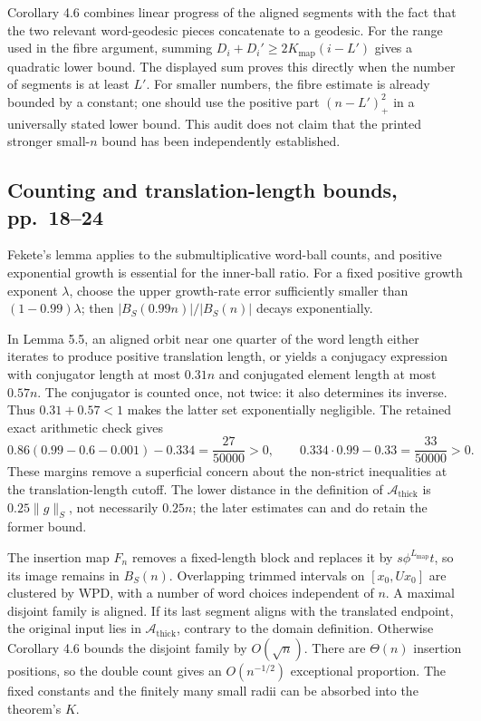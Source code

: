 \documentclass[10pt]{article}
\begin{document}
Corollary 4.6 combines linear progress of the aligned segments with the fact that the two relevant word-geodesic pieces concatenate to a geodesic. For the range used in the fibre argument, summing \(D_i+D_i'\ge 2K_{\mathrm{map}}(i-L')\) gives a quadratic lower bound. The displayed sum proves this directly when the number of segments is at least \(L'\). For smaller numbers, the fibre estimate is already bounded by a constant; one should use the positive part \((n-L')_+^2\) in a universally stated lower bound. This audit does not claim that the printed stronger small-\(n\) bound has been independently established.\par
\subsection*{Counting and translation-length bounds, pp. 18–24}
Fekete’s lemma applies to the submultiplicative word-ball counts, and positive exponential growth is essential for the inner-ball ratio. For a fixed positive growth exponent \(\lambda\), choose the upper growth-rate error sufficiently smaller than \((1-0.99)\lambda\); then \(|B_S(0.99n)|/|B_S(n)|\) decays exponentially.\par
In Lemma 5.5, an aligned orbit near one quarter of the word length either iterates to produce positive translation length, or yields a conjugacy expression with conjugator length at most \(0.31n\) and conjugated element length at most \(0.57n\). The conjugator is counted once, not twice: it also determines its inverse. Thus \(0.31+0.57<1\) makes the latter set exponentially negligible. The retained exact arithmetic check gives \[0.86(0.99-0.6-0.001)-0.334=\frac{27}{50000}>0,\qquad
0.334\cdot0.99-0.33=\frac{33}{50000}>0.\] These margins remove a superficial concern about the non-strict inequalities at the translation-length cutoff. The lower distance in the definition of \(\mathcal A_{\mathrm{thick}}\) is \(0.25\|g\|_S\), not necessarily \(0.25n\); the later estimates can and do retain the former bound.\par
The insertion map \(F_n\) removes a fixed-length block and replaces it by \(s\phi^{L_{\mathrm{map}}}t\), so its image remains in \(B_S(n)\). Overlapping trimmed intervals on \([x_0,Ux_0]\) are clustered by WPD, with a number of word choices independent of \(n\). A maximal disjoint family is aligned. If its last segment aligns with the translated endpoint, the original input lies in \(\mathcal A_{\mathrm{thick}}\), contrary to the domain definition. Otherwise Corollary 4.6 bounds the disjoint family by \(O(\sqrt n)\). There are \(\Theta(n)\) insertion positions, so the double count gives an \(O(n^{-1/2})\) exceptional proportion. The fixed constants and the finitely many small radii can be absorbed into the theorem’s \(K\).\par
\end{document}
